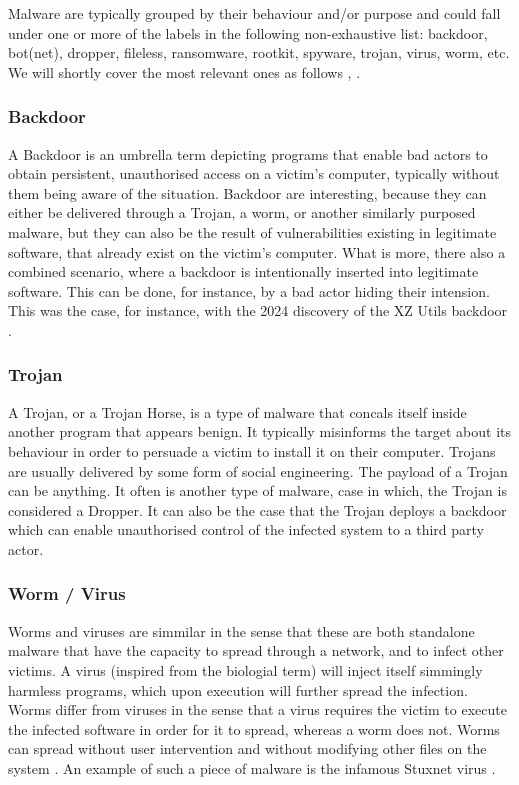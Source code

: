 Malware are typically grouped by their behaviour and/or purpose and could fall under one or more of the labels in the following non-exhaustive list: backdoor, bot(net), dropper, fileless, ransomware, rootkit, spyware, trojan, virus, worm, etc. We will shortly cover the most relevant ones as follows \cite{wiki_malware}, \cite{zeusvm}.

\subsubsection{Backdoor}

A Backdoor is an umbrella term depicting programs that enable bad actors to obtain persistent, unauthorised access on a victim's computer, typically without them being aware of the situation. Backdoor are interesting, because they can either be delivered through a Trojan, a worm, or another similarly purposed malware, but they can also be the result of vulnerabilities existing in legitimate software, that already exist on the victim's computer. What is more, there also a combined scenario, where a backdoor is intentionally inserted into legitimate software. This can be done, for instance, by a bad actor hiding their intension. This was the case, for instance, with the 2024 discovery of the XZ Utils backdoor \cite{xz_backdoor}.

\subsubsection{Trojan}

A Trojan, or a Trojan Horse, is a type of malware that concals itself inside another program that appears benign. It typically misinforms the target about its behaviour in order to persuade a victim to install it on their computer. Trojans are usually delivered by some form of social engineering. The payload of a Trojan can be anything. It often is another type of malware, case in which, the Trojan is considered a Dropper. It can also be the case that the Trojan deploys a backdoor which can enable unauthorised control of the infected system to a third party actor.

\subsubsection{Worm / Virus}

Worms and viruses are simmilar in the sense that these are both standalone malware that have the capacity to spread through a network, and to infect other victims. A virus (inspired from the biologial term) will inject itself simmingly harmless programs, which upon execution will further spread the infection. Worms differ from viruses in the sense that a virus requires the victim to execute the infected software in order for it to spread, whereas a worm does not. Worms can spread without user intervention and without modifying other files on the system \cite{wiki_malware}. An example of such a piece of malware is the infamous Stuxnet virus \cite{stuxnet}.

